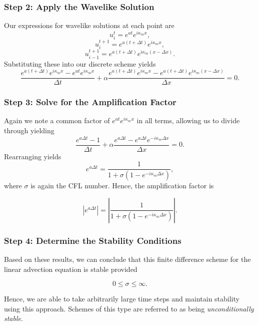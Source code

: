\subsubsection{Step 2: Apply the Wavelike Solution}
Our expressions for wavelike solutions at each point are
\begin{equation}
	u_{i}^t = e^{at} e^{i \kappa_m x},
\end{equation}
\begin{equation}
	u_{i}^{t+1} = e^{a(t + \Delta t)} e^{i \kappa_m x},
\end{equation}
\begin{equation}
	u_{i-1}^{t+1} = e^{a(t + \Delta t)} e^{i \kappa_m (x - \Delta x)}.
\end{equation}
Substituting these into our discrete scheme yields
\begin{equation}
	\frac{e^{a(t + \Delta t)} e^{i \kappa_m x} - e^{at} e^{i \kappa_m x}}{\Delta t} +  \alpha \frac{e^{a(t + \Delta t)} e^{i \kappa_m x} - e^{a(t + \Delta t)} e^{i \kappa_m (x - \Delta x)}}{\Delta x} = 0.
\end{equation}

\subsubsection{Step 3: Solve for the Amplification Factor}
Again we note a common factor of $e^{at} e^{i \kappa_m x}$ in all terms, allowing us to divide through yielding
\begin{equation}
	\frac{e^{a\Delta t} - 1}{\Delta t} +  \alpha \frac{e^{a\Delta t} - e^{a\Delta t} e^{-i \kappa_m \Delta x}}{\Delta x} = 0.
\end{equation}
Rearranging yields
\begin{equation}
	e^{a\Delta t} = \frac{1}{1 + \sigma \left( 1 - e^{-i \kappa_m \Delta x} \right)},
\end{equation}
where $\sigma$ is again the CFL number. Hence, the amplification factor is
\begin{eqBox}
\begin{equation}
	|e^{a\Delta t}| = \left| \frac{1}{1 + \sigma \left( 1 - e^{-i \kappa_m \Delta x} \right)} \right|.
\end{equation}
\end{eqBox}

\subsubsection{Step 4: Determine the Stability Conditions}
Based on these results, we can conclude that this finite difference scheme for the linear advection equation is stable provided
\begin{eqBox}
\begin{equation}
	0 \leq \sigma \leq \infty.
\end{equation}
\end{eqBox}
Hence, we are able to take arbitrarily large time steps and maintain stability using this approach. Schemes of this type are referred to as being {\it unconditionally stable}.

